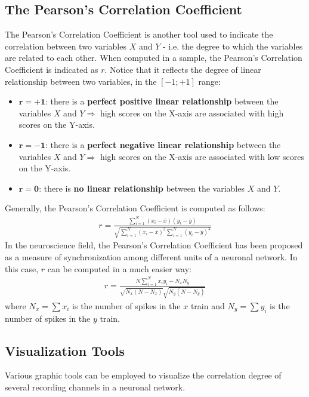\subsection{The Pearson's Correlation Coefficient}
The Pearson's Correlation Coefficient is another tool used to indicate the correlation between two variables \(X\) and \(Y\) - i.e. the degree to which the variables are related to each other.
When computed in a sample, the Pearson's Correlation Coefficient is indicated as \(r\).
Notice that it reflects the degree of linear relationship between two variables,
in the \([-1;+1]\) range:
\begin{itemize}
    \item \(\mathbf{r=+1}\): there is a \textbf{perfect positive linear
              relationship} between the variables \(X\) and \(Y\Rightarrow\) high scores on
          the X-axis are associated with high scores on the Y-axis.
    \item \(\mathbf{r=-1}\): there is a \textbf{perfect negative linear
              relationship} between the variables \(X\) and \(Y\Rightarrow\) high scores on
          the X-axis are associated with low scores on the Y-axis.
    \item \(\mathbf{r=0}\): there is \textbf{no linear
              relationship} between the variables \(X\) and \(Y\).
\end{itemize}
Generally, the Pearson's Correlation Coefficient is computed as follows:
\begin{align*}
    r=\frac{\sum_{i=1}^{N}(x_i-\overline{x})(y_i-\overline{y})}{\sqrt{\sum_{i=1}^{N}(x_i-\overline{x})^2\sum_{i=1}^{N}(y_i-\overline{y})^2}}
\end{align*}
In the neuroscience field, the Pearson's Correlation Coefficient has been proposed
as a measure of synchronization among different units of a neuronal network.
In this case, \(r\) can be computed in a much easier way:
\begin{align*}
    r=\frac{N\sum_{i=1}^{N}x_{i}y_{i}-N_{x}N_{y}}{\sqrt{N_{x}(N-N_{x})}\sqrt{N_{y}(N-N_{y})}}
\end{align*}
where \(N_x=\sum{x_i}\) is the number of spikes in the \(x\) train and \(N_y=\sum{y_i}\) is the number of spikes in the \(y\) train.
\subsection{Visualization Tools}
Various graphic tools can be employed to visualize the correlation degree of several
recording channels in a neuronal network.
